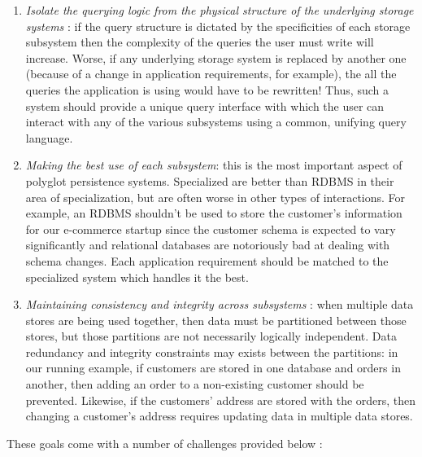 \begin{enumerate}[label=(\roman*)]
\item{\emph{Isolate the querying logic from the physical structure of the underlying storage systems} : if the query structure is dictated by the specificities of each storage subsystem then the complexity of the queries the user must write will increase. Worse, if any underlying storage system is replaced by another one (because of a change in application requirements, for example), the all the queries the application is using would have to be rewritten! Thus, such a system should provide a unique query interface with which the user can interact with any of the various subsystems using a common, unifying query language.}
\item{\emph{Making the best use of each subsystem}: this is the most important aspect of polyglot persistence systems. Specialized are better than RDBMS in their area of specialization, but are often worse in other types of interactions. For example, an RDBMS shouldn't be used to store the customer's information for our e-commerce startup since the customer schema is expected to vary significantly and relational databases are notoriously bad at dealing with schema changes. Each application requirement should be matched to the specialized system which handles it the best.}
\item{\emph{Maintaining consistency and integrity across subsystems} : when multiple data stores are being used together, then data must be partitioned between those stores, but those partitions are not necessarily logically independent. Data redundancy and integrity constraints may exists between the partitions: in our running example, if customers are stored in one database and orders in another, then adding an order to a non-existing customer should be prevented. Likewise, if the customers' address are stored with the orders, then changing a customer's address requires updating data in multiple data stores.}
\end{enumerate}

These goals come with a number of challenges provided below :

